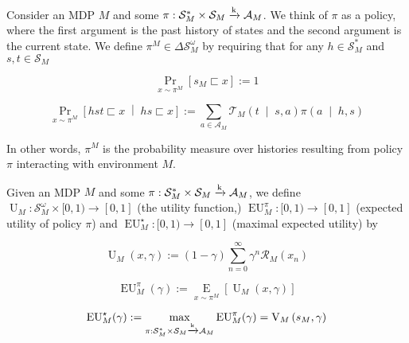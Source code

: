 \documentclass[anon,12pt]{colt2018} %
\newcommand{\AP}[1]{\left(#1\right)}
\newcommand{\AB}[1]{\left[#1\right]}
\newcommand{\APM}[2]{\left(#1\;\middle\vert\;#2\right)}
\newcommand{\ABM}[2]{\left[#1\;\middle\vert\;#2\right]}
\newcommand{\Pa}[2]{\underset{#1}{\operatorname{Pr}}\AB{#2}}
\newcommand{\CP}[3]{\underset{#1}{\operatorname{Pr}}\ABM{#2}{#3}}
\newcommand{\Ea}[2]{\underset{#1}{\operatorname{E}}\AB{#2}}
\newcommand{\K}{\xrightarrow{\textnormal{k}}}
\newcommand{\A}{\mathcal{A}}
\newcommand{\St}{\mathcal{S}}
\newcommand{\T}{\mathcal{T}}
\newcommand{\R}{\mathcal{R}}
\newcommand{\Ut}{\operatorname{U}}
\newcommand{\V}{\operatorname{V}}
\newcommand{\EU}{\operatorname{EU}}
\begin{document}
\begin{samepage}
\begin{definition}

Consider an MDP $M$ and some $\pi: \St_M^* \times \St_M \K \A_M$. We think of $\pi$ as a policy, where the first argument is the past history of states and the second argument is the current state. We define $\pi^M \in \Delta\St_M^\omega$ by requiring that for any $h \in \St_M^*$ and $s,t \in \St_M$

\begin{equation}
\Pa{x\sim\pi^M }{s_M \sqsubset x} := 1
\end{equation}


\begin{equation}
\CP{x\sim\pi^M }{hst \sqsubset x}{hs \sqsubset x} := \sum_{a \in \A_M} {\T_M\APM{t}{s,a} \pi\APM{a}{h,s}}
\end{equation}

In other words, $\pi^M$ is the probability measure over histories resulting from policy $\pi$ interacting with environment $M$.

\end{definition}
\end{samepage}

\begin{samepage}
\begin{definition}
\label{def:utility}

Given an MDP $M$ and some $\pi: \St_M^* \times \St_M \K \A_M$, we define $\Ut_M: \St_M^\omega \times [0,1) \rightarrow [0,1]$ (the utility function,) $\EU_M^\pi: [0,1) \rightarrow [0,1]$ (expected utility of policy $\pi$) and $\EU_M^\star: [0,1) \rightarrow [0,1]$ (maximal expected utility) by

\begin{equation}
\Ut_M(x,\gamma) := (1-\gamma)\sum_{n=0}^\infty {\gamma^n \R_M\AP{x_n}}
\end{equation}

\begin{equation}
\EU_M^\pi(\gamma) := \Ea{x\sim\pi^M}{\Ut_M(x,\gamma)}
\end{equation}

\begin{equation}
\EU_M^\star(\gamma):=\max_{\pi: \St_M^* \times \St_M \K \A_M} {\EU_M^\pi(\gamma)} = \V_M\AP{s_M,\gamma}
\end{equation}

\end{definition}
\end{samepage}
\end{document}

